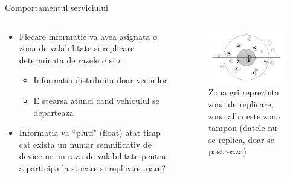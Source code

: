 \documentclass{beamer}
\begin{document}
\begin{frame}{Comportamentul serviciului}
	 \begin{columns}
	    \begin{column}[l]{0.55\textwidth}
			\begin{itemize}
			  \item Fiecare informatie va avea asignata o zona de valabilitate si
			  replicare determinata de razele $a$ si $r$
			  \begin{itemize}
			  \item Informatia distribuita doar vecinilor
			  \item E stearsa atunci cand vehiculul se
			  departeaza 
			  \end{itemize}
			  \item Informatia va ``pluti" (float) atat timp cat exista un numar
			  semnificativ de device-uri in raza de valabilitate pentru a participa la
			  stocare si replicare\ldots oare?
			\end{itemize}
		\end{column}
		\begin{column}[r]{0.45\textwidth}
			\begin{figure}
				\vspace*{-2cm}
				\centering
		    	\includegraphics[scale=0.35]{img/anchor_zone}
		    	\caption{Zona gri reprezinta zona de replicare, zona alba este zona
		    	tampon (datele nu se replica, doar se pastreaza)}
		    \end{figure}
		\end{column}
	\end{columns}
\end{frame}
\end{document}
